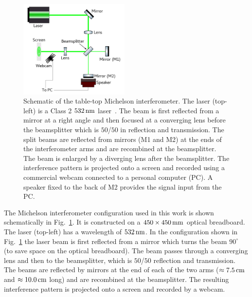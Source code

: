 \documentclass[paper-main.tex]{subfiles}
\begin{document}
\begin{figure}
	\includegraphics[width=0.49\textwidth]{figures/ifo_schematic_webcam_edit.pdf}
	\caption{\label{fig:ifo_schematic_webcam}
Schematic of the table-top Michelson interferometer. 
The laser (top-left) is a Class 2 $532\,{\rm nm}$ laser~\cite{ThorLabsIFO}. 
The beam is first reflected from a mirror at a right angle and then focused at a converging lens before the beamsplitter which is $50$/$50$ in reflection and transmission. 
The split beams are reflected from mirrors (M1 and M2) at the ends of the interferometer arms and are recombined at the beamsplitter. 
The beam is enlarged by a diverging lens after the beamsplitter. 
The interference pattern is projected onto a screen and recorded using a commercial webcam connected to a personal computer (PC). 
A speaker fixed to the back of M2 provides the signal input from the PC.  
    }
\end{figure}

The Michelson interferometer configuration used in this work is shown schematically in Fig.~\ref{fig:ifo_schematic_webcam}.
It is constructed on a $450 \times 450 \,{\rm mm} $ optical breadboard. 
The laser (top-left) has a wavelength of $532\,{\rm nm}$.
In the configuration shown in Fig.~\ref{fig:ifo_schematic_webcam} the laser beam is first reflected from a mirror which turns the beam $90^{\circ}$ (to save space on the optical breadboard). 
The beam passes through a converging lens and then to the beamsplitter, which is $50$/$50$ reflection and transmission. 
The beams are reflected by mirrors at the end of each of the two arms ($\approx 7.5\,{\rm cm}$ and $\approx 10.0\,{\rm cm}$ long) and are recombined at the beamsplitter. 
The resulting interference pattern is projected onto a screen and recorded by a webcam. 
\end{document}
